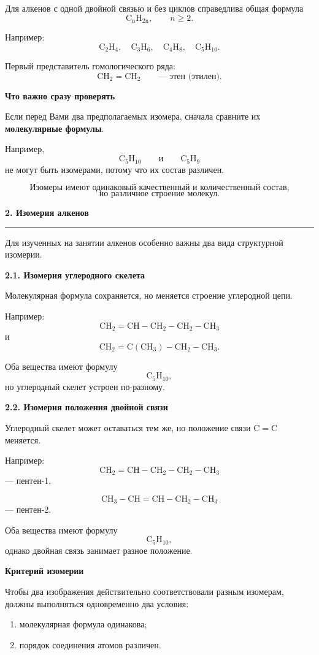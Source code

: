 \documentclass[a4paper,12pt]{article}
\newcommand{\lessonsection}[1]{%
    \vspace{0.7em}
    {\Large\bfseries\color{darkaccent}#1}\par
    \vspace{0.15em}
    {\color{linegray}\rule{\linewidth}{0.7pt}}
    \vspace{0.35em}
}
\newcommand{\sublesson}[1]{%
    \vspace{0.4em}
    {\large\bfseries\color{accent}#1}\par
}
\newcommand{\important}[1]{\textbf{\color{darkaccent}#1}}
\begin{document}
Для алкенов с одной двойной связью и без циклов справедлива общая формула
\[
\boxed{\mathrm{C_nH_{2n}},\qquad n\ge 2.}
\]

Например:
\[
\mathrm{C_2H_4,\quad C_3H_6,\quad C_4H_8,\quad C_5H_{10}.}
\]

Первый представитель гомологического ряда:
\[
\mathrm{CH_2=CH_2}
\qquad\text{--- этен (этилен).}
\]

\sublesson{Что важно сразу проверять}

Если перед Вами два предполагаемых изомера, сначала сравните их \important{молекулярные формулы}.

Например,
\[
\mathrm{C_5H_{10}}
\qquad\text{и}\qquad
\mathrm{C_5H_9}
\]
не могут быть изомерами, потому что их состав различен.

\[
\boxed{
\text{Изомеры имеют одинаковый качественный и количественный состав,}
}
\]
\[
\boxed{
\text{но различное строение молекул.}
}
\]


\lessonsection{2. Изомерия алкенов}

Для изученных на занятии алкенов особенно важны два вида структурной изомерии.

\sublesson{2.1. Изомерия углеродного скелета}

Молекулярная формула сохраняется, но меняется строение углеродной цепи.

Например:
\[
\mathrm{CH_2=CH-CH_2-CH_2-CH_3}
\]
и
\[
\mathrm{CH_2=C(CH_3)-CH_2-CH_3}.
\]

Оба вещества имеют формулу
\[
\mathrm{C_5H_{10}},
\]
но углеродный скелет устроен по-разному.

\sublesson{2.2. Изомерия положения двойной связи}

Углеродный скелет может оставаться тем же, но положение связи \(\mathrm{C=C}\) меняется.

Например:
\[
\mathrm{CH_2=CH-CH_2-CH_2-CH_3}
\]
--- пентен-1,

\[
\mathrm{CH_3-CH=CH-CH_2-CH_3}
\]
--- пентен-2.

Оба вещества имеют формулу
\[
\mathrm{C_5H_{10}},
\]
однако двойная связь занимает разное положение.

\sublesson{Критерий изомерии}

Чтобы два изображения действительно соответствовали разным изомерам, должны выполняться одновременно два условия:

\begin{enumerate}
    \item молекулярная формула одинакова;
    \item порядок соединения атомов различен.
\end{enumerate}
\end{document}
